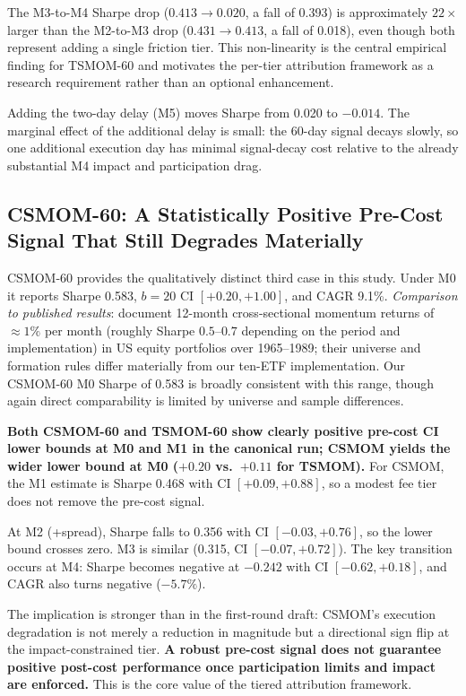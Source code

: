 \documentclass[12pt]{article}
\newcommand{\finding}[1]{\textbf{#1}}
\begin{document}
The M3-to-M4 Sharpe drop ($0.413 \to 0.020$, a fall of 0.393) is
approximately $22\times$ larger than the M2-to-M3 drop ($0.431 \to
0.413$, a fall of 0.018), even though both represent adding a single
friction tier. This non-linearity is the central empirical finding for
TSMOM-60 and motivates the per-tier attribution framework as a research
requirement rather than an optional enhancement.

Adding the two-day delay (M5) moves Sharpe from 0.020 to $-0.014$.
The marginal effect of the additional delay is small: the 60-day signal
decays slowly, so one additional execution day has minimal signal-decay
cost relative to the already substantial M4 impact and participation
drag.

\subsection{CSMOM-60: A Statistically Positive Pre-Cost Signal That
Still Degrades Materially}
\label{sec:csmom_results}

CSMOM-60 provides the qualitatively distinct third case in this study.
Under M0 it reports Sharpe 0.583, $b = 20$ CI $[+0.20, +1.00]$, and
CAGR 9.1\%. \textit{Comparison to published results}: \citet{jegadeesh1993returns}
document 12-month cross-sectional momentum returns of
$\approx 1\%$ per month (roughly Sharpe $0.5$--$0.7$ depending on the period
and implementation) in US equity portfolios over 1965--1989; their universe
and formation rules differ materially from our ten-ETF implementation.
Our CSMOM-60 M0 Sharpe of 0.583 is broadly consistent with this range,
though again direct comparability is limited by universe and sample differences.

\finding{Both CSMOM-60 and TSMOM-60 show clearly positive pre-cost CI
lower bounds at M0 and M1 in the canonical run; CSMOM yields the wider
lower bound at M0 ($+0.20$ vs.\ $+0.11$ for TSMOM).} For CSMOM, the M1
estimate is Sharpe 0.468 with CI $[+0.09, +0.88]$, so a modest fee tier
does not remove the pre-cost signal.

At M2 (+spread), Sharpe falls to 0.356 with CI $[-0.03, +0.76]$, so the
lower bound crosses zero. M3 is similar (0.315, CI $[-0.07, +0.72]$).
The key transition occurs at M4: Sharpe becomes negative at $-0.242$
with CI $[-0.62, +0.18]$, and CAGR also turns negative ($-5.7\%$).

The implication is stronger than in the first-round draft: CSMOM's
execution degradation is not merely a reduction in magnitude but a
directional sign flip at the impact-constrained tier. \finding{A robust
pre-cost signal does not guarantee positive post-cost performance once
participation limits and impact are enforced.} This is the core value of
the tiered attribution framework.
\end{document}
